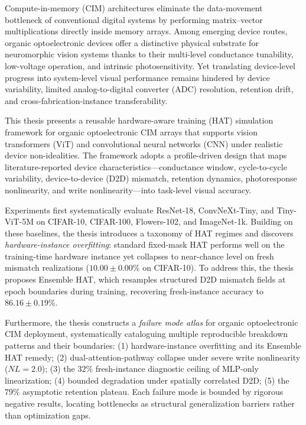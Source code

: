 \begin{englishabstract}
Compute-in-memory (CIM) architectures eliminate the data-movement bottleneck of conventional digital systems by performing matrix--vector multiplications directly inside memory arrays.
Among emerging device routes, organic optoelectronic devices offer a distinctive physical substrate for neuromorphic vision systems thanks to their multi-level conductance tunability, low-voltage operation, and intrinsic photosensitivity.
Yet translating device-level progress into system-level visual performance remains hindered by device variability, limited analog-to-digital converter (ADC) resolution, retention drift, and cross-fabrication-instance transferability.

This thesis presents a reusable hardware-aware training (HAT) simulation framework for organic optoelectronic CIM arrays that supports vision transformers (ViT) and convolutional neural networks (CNN) under realistic device non-idealities.
The framework adopts a profile-driven design that maps literature-reported device characteristics---conductance window, cycle-to-cycle variability, device-to-device (D2D) mismatch, retention dynamics, photoresponse nonlinearity, and write nonlinearity---into task-level visual accuracy.

Experiments first systematically evaluate ResNet-18, ConvNeXt-Tiny, and Tiny-ViT-5M on CIFAR-10, CIFAR-100, Flowers-102, and ImageNet-1k.
Building on these baselines, the thesis introduces a taxonomy of HAT regimes and discovers \emph{hardware-instance overfitting}:
standard fixed-mask HAT performs well on the training-time hardware instance yet collapses to near-chance level on fresh mismatch realizations ($10.00\pm0.00\%$ on CIFAR-10).
To address this, the thesis proposes Ensemble HAT, which resamples structured D2D mismatch fields at epoch boundaries during training, recovering fresh-instance accuracy to $86.16\pm0.19\%$.

Furthermore, the thesis constructs a \emph{failure mode atlas} for organic optoelectronic CIM deployment,
systematically cataloguing multiple reproducible breakdown patterns and their boundaries:
(1) hardware-instance overfitting and its Ensemble HAT remedy;
(2) dual-attention-pathway collapse under severe write nonlinearity ($NL=2.0$);
(3) the $32\%$ fresh-instance diagnostic ceiling of MLP-only linearization;
(4) bounded degradation under spatially correlated D2D;
(5) the $79\%$ asymptotic retention plateau.
Each failure mode is bounded by rigorous negative results, locating bottlenecks as structural generalization barriers rather than optimization gaps.


\end{englishabstract}
